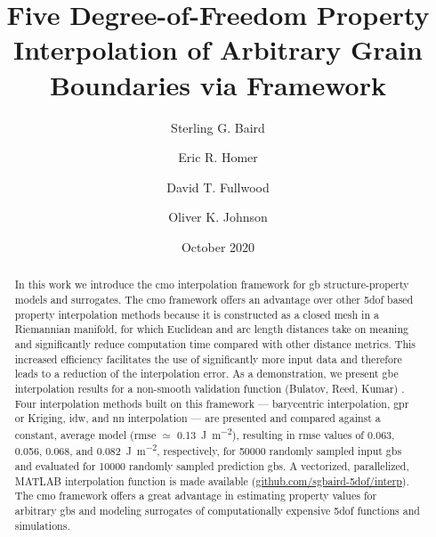 \documentclass[preprint,12pt]{elsarticle}
\title{Five Degree-of-Freedom Property Interpolation of Arbitrary Grain Boundaries via \glsentrytitlecase{cmo}{long} Framework}
\author[myu]{Sterling G. Baird}
\author[myu]{Eric R. Homer}
\author[myu]{David T. Fullwood}
\author[myu]{Oliver K. Johnson\corref{cor1}}
\date{October 2020}
\begin{document}
\begin{abstract}
    In this work we introduce the \gls{cmo} interpolation framework for \gls{gb} structure-property models and surrogates. The \gls{cmo} framework offers an advantage over other \gls{5dof} based property interpolation methods because it is constructed as a closed mesh in a Riemannian manifold, for which Euclidean and arc length distances take on meaning and significantly reduce computation time compared with other distance metrics. This increased efficiency facilitates the use of significantly more input data and therefore leads to a reduction of the interpolation error. As a demonstration, we present \gls{gbe} interpolation results for a non-smooth validation function (Bulatov, Reed, Kumar) \cite{bulatovGrainBoundaryEnergy2014}.
    Four interpolation methods built on this framework --- barycentric interpolation, \gls{gpr} or Kriging, \gls{idw}, and \gls{nn} interpolation --- are presented and compared against a constant, average model (\gls{rmse} $\simeq$ \SI{0.13}{\J\per\square\meter}), resulting in \gls{rmse} values of 0.063, 0.056, 0.068, and \SI{0.082}{\J\per\square\meter}, respectively, for \num{50000} randomly sampled input \glspl{gb} and evaluated for \num{10000} randomly sampled prediction \glspl{gb}. A vectorized, parallelized, MATLAB interpolation function is made available (\url{github.com/sgbaird-5dof/interp}). The \gls{cmo} framework offers a great advantage in estimating property values for arbitrary \glspl{gb} and modeling surrogates of computationally expensive \gls{5dof} functions and simulations.
\end{abstract}
\end{document}
